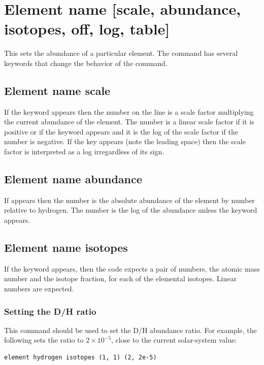 \section{Element name [scale, abundance, isotopes, off, log, table]}

This sets the abundance of a particular element.
The command has several
keywords that change the behavior of the command.

\subsection{Element name scale}

If the keyword  appears
then the number on the line is a scale factor
multiplying the current abundance of the element.
The number is a linear
scale factor if it is positive or if the 
keyword appears and it is
the log of the scale factor if the number is negative.
If the key 
appears (note the leading space) then the scale factor
is interpreted as
a log irregardless of its sign.

\subsection{Element name abundance}

If  appears then the number is
the absolute abundance of the
element by number relative to hydrogen.
The number is the log of the
abundance unless the  keyword appears.

\subsection{Element name isotopes}

If the keyword  appears, then
the code expects a pair of numbers, the atomic mass
number and the isotope fraction, for each of the
elemental isotopes.
Linear numbers are expected.

\subsubsection{Setting the D/H ratio}

This command should be used to set the D/H abundance ratio.
For example, the following sets the ratio to $2\times 10^{-5}$,
close to the current solar-system value:
%
\begin{verbatim}
element hydrogen isotopes (1, 1) (2, 2e-5)
\end{verbatim}

